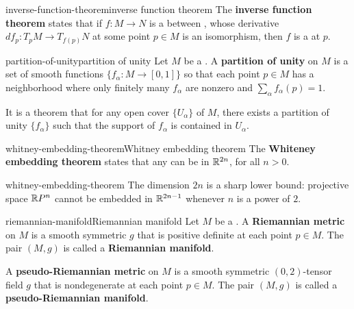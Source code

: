 \begin{topic}{inverse-function-theorem}{inverse function theorem}
    The \textbf{inverse function theorem} states that if $f : M \to N$ is a  between , whose derivative $df_p : T_p M \to T_{f(p)} N$ at some point $p \in M$ is an isomorphism, then $f$ is a  at $p$.
\end{topic}

\begin{topic}{partition-of-unity}{partition of unity}
    Let $M$ be a . A \textbf{partition of unity} on $M$ is a set of smooth functions $\{ f_\alpha : M \to [0, 1] \}$ so that each point $p \in M$ has a neighborhood where only finitely many $f_\alpha$ are nonzero and $\sum_\alpha f_\alpha(p) = 1$.
    
    It is a theorem that for any open cover $\{ U_\alpha \}$ of $M$, there exists a partition of unity $\{ f_\alpha \}$ such that the support of $f_\alpha$ is contained in $U_\alpha$.
\end{topic}

\begin{topic}{whitney-embedding-theorem}{Whitney embedding theorem}
    The \textbf{Whiteney embedding theorem} states that any  can be  in $\mathbb{R}^{2n}$, for all $n > 0$.
\end{topic}

\begin{example}{whitney-embedding-theorem}
    The dimension $2n$ is a sharp lower bound: projective space $\mathbb{R} P^n$ cannot be embedded in $\mathbb{R}^{2n - 1}$ whenever $n$ is a power of $2$.
\end{example}

\begin{topic}{riemannian-manifold}{Riemannian manifold}
    Let $M$ be a . A \textbf{Riemannian metric} on $M$ is a smooth symmetric  $g$ that is positive definite at each point $p \in M$. The pair $(M, g)$ is called a \textbf{Riemannian manifold}.
    
    A \textbf{pseudo-Riemannian metric} on $M$ is a smooth symmetric $(0, 2)$-tensor field $g$ that is nondegenerate at each point $p \in M$. The pair $(M, g)$ is called a \textbf{pseudo-Riemannian manifold}.
\end{topic}

